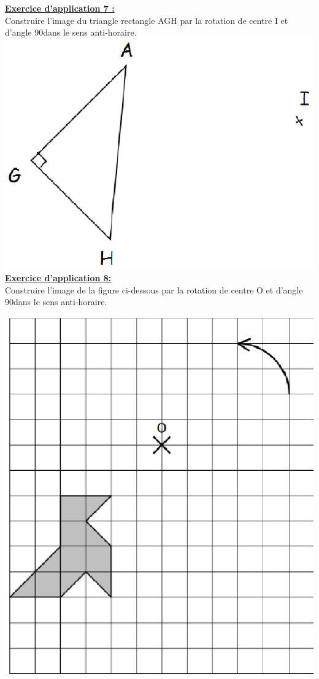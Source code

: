 \documentclass[a4paper,11pt]{article}
\begin{document}
\textbf{\underline{Exercice d'application 7 :}}\\
Construire l'image du triangle rectangle AGH par la rotation de centre I et d'angle 90\degre dans le sens anti-horaire.\\
\includegraphics[scale=0.9]{rotation2.eps} \\

\textbf{\underline{Exercice d'application 8:}}\\
Construire l'image de la figure ci-dessous par la rotation de centre O et d'angle 90\degre dans le sens anti-horaire.\\
\begin{center}
\includegraphics[scale=0.9]{rotation3.eps} \\
\end{center}
\end{document}
